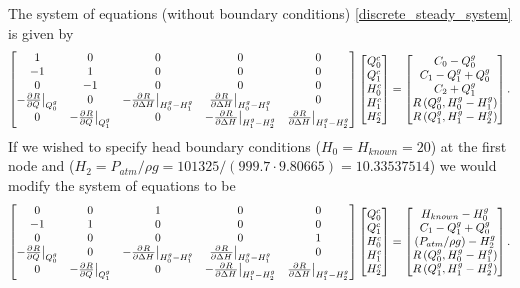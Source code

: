The system of equations (without boundary conditions) \eqref{discrete_steady_system} is given by
\begin{align*}
\begin{bmatrix}
1 & 0 & 0 & 0 & 0 \\
-1 & 1 & 0 & 0 & 0 \\
0 & -1 & 0 & 0 & 0 \\
-\frac{\partial^{} R}{\partial Q^{}}\big\vert_{Q_0^g} & 0 & -\frac{\partial^{} R}{\partial \Delta H^{}}\big\vert_{H_0^g - H_1^g} & \frac{\partial^{} R}{\partial \Delta H^{}}\big\vert_{H_0^g - H_1^g} & 0 \\
0 & -\frac{\partial^{} R}{\partial Q^{}}\big\vert_{Q_1^g} & 0 & -\frac{\partial^{} R}{\partial \Delta H^{}}\big\vert_{H_1^g - H_2^g} & \frac{\partial^{} R}{\partial \Delta H^{}}\big\vert_{H_1^g - H_2^g}
\end{bmatrix} \begin{bmatrix}
Q_0^c \\ Q_1^c \\ H_0^c \\ H_1^c \\ H_2^c
\end{bmatrix} = \begin{bmatrix}
C_0 - Q_0^g \\ 
C_1 - Q_1^g + Q_0^g \\ 
C_2 + Q_1^g \\ 
R\left(Q_0^g, H_0^g - H_1^g \right) \\ 
R\left(Q_1^g, H_1^g - H_2^g \right)
\end{bmatrix}.
\end{align*}
If we wished to specify head boundary conditions ($H_0 = H_{known} = 20$) at the first node and ($H_2 = P_{atm} / \rho g = 101325 / (999.7 \cdot 9.80665) = 10.33537514$) we would modify the system of equations to be 
\begin{align*}
\begin{bmatrix}
0 & 0 & 1 & 0 & 0 \\
-1 & 1 & 0 & 0 & 0 \\
0 & 0 & 0 & 0 & 1 \\
-\frac{\partial^{} R}{\partial Q^{}}\big\vert_{Q_0^g} & 0 & -\frac{\partial^{} R}{\partial \Delta H^{}}\big\vert_{H_0^g - H_1^g} & \frac{\partial^{} R}{\partial \Delta H^{}}\big\vert_{H_0^g - H_1^g} & 0 \\
0 & -\frac{\partial^{} R}{\partial Q^{}}\big\vert_{Q_1^g} & 0 & -\frac{\partial^{} R}{\partial \Delta H^{}}\big\vert_{H_1^g - H_2^g} & \frac{\partial^{} R}{\partial \Delta H^{}}\big\vert_{H_1^g - H_2^g}
\end{bmatrix} \begin{bmatrix}
Q_0^c \\ Q_1^c \\ H_0^c \\ H_1^c \\ H_2^c
\end{bmatrix} = \begin{bmatrix}
H_{known} - H_0^g \\ 
C_1 - Q_1^g + Q_0^g \\ 
\left( P_{atm} / \rho g \right) - H_2^g \\ 
R\left(Q_0^g, H_0^g - H_1^g \right) \\ 
R\left(Q_1^g, H_1^g - H_2^g \right)
\end{bmatrix}.
\end{align*}
